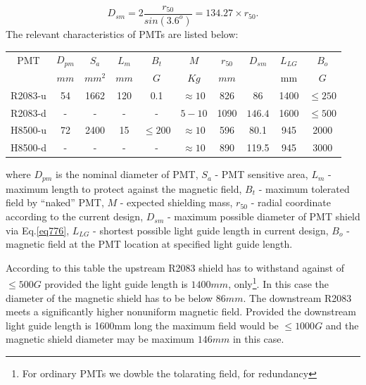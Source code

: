 \documentclass[12pt]{article}
\begin{document}
\begin{equation}
D_{sm}=2\frac{r_{50}}{sin(3.6^o)} =134.27\times r_{50}.
\label{eq776}
\end{equation}
The relevant characteristics of PMTs are listed below:
\begin{center}
\begin{tabular}{|c|c|c|c|c|c|c|c|c|c|}  \hline
PMT         &$D_{pm}$& $S_a$  & $L_{m}$  &$B_{t}$  & $M$       &$r_{50}$&$D_{sm}$&$L_{LG}$& $B_{o}$   \\
            &$mm$     & $mm^2$ & $mm$     &$G$     & $Kg$      & $mm$   &        &  mm    & $G$     \\ \hline
%
%
R2083-u     &54       &1662    &120       &0.1      & $\approx10$    & 826    &  86  & 1400   & $\leq250$      \\
R2083-d     &-        &  -     & -        &  -      & $5-10$    & 1090   & $146.4$  & 1600   & $\leq500$     \\ \hline
H8500-u     &72       &2400    &15        &$\leq200$  &$\approx10$&  596   &  80.1  & 945    & 2000     \\
H8500-d     & -       &  -     & -        &  -       &$\approx10$& 890    & 119.5  & 945    & 3000     \\ \hline
\end{tabular}
\end{center}
where
$D_{pm}$ is the nominal  diameter of PMT,
$S_a$ - PMT sensitive area,
$L_{m}$ - maximum length to protect against the magnetic field,
$B_{t}$ - maximum tolerated field by ``naked'' PMT,
$M$       - expected  shielding mass,
$r_{50}$  - radial coordinate according to the current design,
$D_{sm}$  - maximum possible diameter of PMT shield via  Eq.\ref{eq776},
$L_{LG}$  - shortest possible light guide length in current design,
$B_{o}$   - magnetic field at the PMT location at specified light guide length.


According to this table the upstream R2083 shield has to withstand against of $\leq 500G$
provided the light guide length is $1400mm$, only\footnote{For ordinary PMTs we dowble the
tolarating field, for redundancy}. 
In this case the diameter of the magnetic shield has to be below $86mm$.
The downstream R2083 meets a significantly higher nonuniform  magnetic  field.
Provided the  downstream light guide length is 1600mm long the maximum field would
be $\leq 1000G$ and the magnetic shield diameter may be maximum  $146mm$ in this case.
\end{document}
